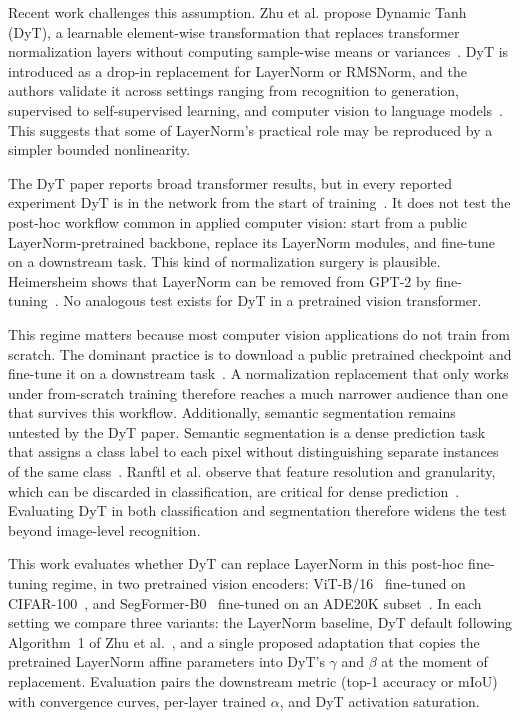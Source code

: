 \documentclass[10pt,twocolumn,letterpaper]{article}
\begin{document}
Recent work challenges this assumption. Zhu et al. propose Dynamic Tanh (DyT), a learnable element-wise transformation that replaces transformer normalization layers without computing sample-wise means or variances~\cite{zhu2025dyt}. DyT is introduced as a drop-in replacement for LayerNorm or RMSNorm, and the authors validate it across settings ranging from recognition to generation, supervised to self-supervised learning, and computer vision to language models~\cite{zhu2025dyt}. This suggests that some of LayerNorm's practical role may be reproduced by a simpler bounded nonlinearity.

The DyT paper reports broad transformer results, but in every reported experiment DyT is in the network from the start of training~\cite{zhu2025dyt}. It does not test the post-hoc workflow common in applied computer vision: start from a public LayerNorm-pretrained backbone, replace its LayerNorm modules, and fine-tune on a downstream task. This kind of normalization surgery is plausible. Heimersheim shows that LayerNorm can be removed from GPT-2 by fine-tuning~\cite{heimersheim2024remove}. No analogous test exists for DyT in a pretrained vision transformer.

This regime matters because most computer vision applications do not train from scratch. The dominant practice is to download a public pretrained checkpoint and fine-tune it on a downstream task~\cite{kornblith2019better,kolesnikov2020bit}. A normalization replacement that only works under from-scratch training therefore reaches a much narrower audience than one that survives this workflow. Additionally, semantic segmentation remains untested by the DyT paper. Semantic segmentation is a dense prediction task that assigns a class label to each pixel without distinguishing separate instances of the same class~\cite{long2015fcn,torralba2024foundations}. Ranftl et al. observe that feature resolution and granularity, which can be discarded in classification, are critical for dense prediction~\cite{ranftl2021dpt}. Evaluating DyT in both classification and segmentation therefore widens the test beyond image-level recognition.

This work evaluates whether DyT can replace LayerNorm in this post-hoc fine-tuning regime, in two pretrained vision encoders: ViT-B/16~\cite{dosovitskiy2021vit} fine-tuned on CIFAR-100~\cite{krizhevsky2009cifar100}, and SegFormer-B0~\cite{xie2021segformer} fine-tuned on an ADE20K subset~\cite{zhou2017ade20k}. In each setting we compare three variants: the LayerNorm baseline, DyT default following Algorithm~1 of Zhu et al.~\cite{zhu2025dyt}, and a single proposed adaptation that copies the pretrained LayerNorm affine parameters into DyT's $\gamma$ and $\beta$ at the moment of replacement. Evaluation pairs the downstream metric (top-1 accuracy or mIoU) with convergence curves, per-layer trained $\alpha$, and DyT activation saturation.
\end{document}

